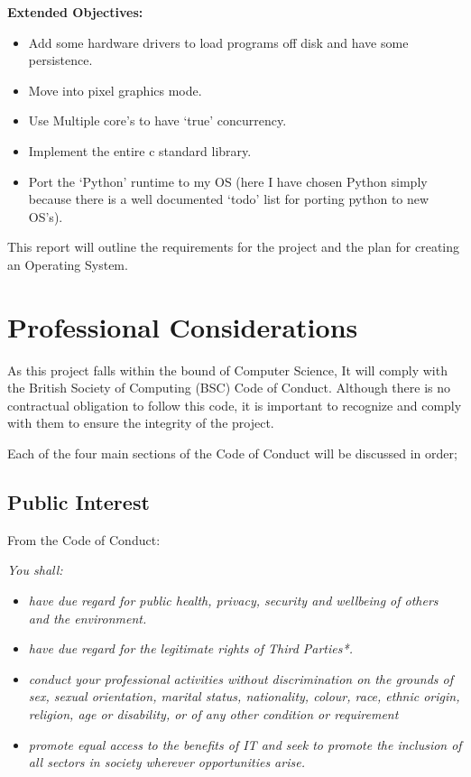\documentclass[a4paper]{report}
\begin{document}
\textbf {Extended Objectives:}


\begin{itemize}
\item Add some hardware drivers to load programs off disk and have some persistence.
\item Move into pixel graphics mode.
\item Use Multiple core's to have `true' concurrency.
\item Implement the entire c standard library.
\item Port the `Python' runtime to my OS (here I have chosen Python simply because there is a well documented `todo' list for porting python to new OS's).
\end{itemize}



This report will outline the requirements for the project and the plan for creating an Operating System.

\chapter{Professional Considerations}

As this project falls within the bound of Computer Science, It will comply with the British Society of Computing (BSC) Code of Conduct. Although there is no contractual obligation to follow this code, it is important to recognize and comply with them to ensure the integrity of the project.

Each of the four main sections of the Code of Conduct will be discussed in order;

\section{Public Interest}

From the Code of Conduct: \cite{CoC}

\textit{You shall:}
\begin{itemize}
\item \textit{have due regard for public health, privacy, security and wellbeing of others and the environment.}
\item \textit{have due regard for the legitimate rights of Third Parties*.}
\item \textit{conduct your professional activities without discrimination on the grounds of sex, sexual orientation, marital status, nationality, colour, race, ethnic origin, religion, age or disability, or of any other condition or requirement }
\item \textit{promote equal access to the benefits of IT and seek to promote the inclusion of all sectors in society wherever opportunities arise.}
\end{itemize}
\end{document}
